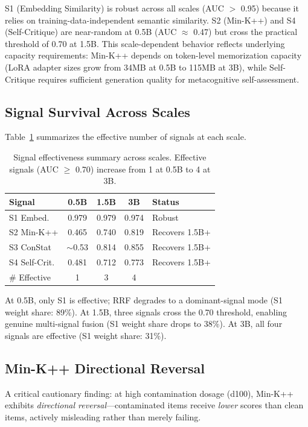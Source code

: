 \documentclass[11pt,a4paper]{article}
\begin{document}
S1 (Embedding Similarity) is robust across all scales (AUC $>$ 0.95) because it relies on training-data-independent semantic similarity.
S2 (Min-K++) and S4 (Self-Critique) are near-random at 0.5B (AUC $\approx$ 0.47) but cross the practical threshold of 0.70 at 1.5B.
This scale-dependent behavior reflects underlying capacity requirements: Min-K++ depends on token-level memorization capacity (LoRA adapter sizes grow from 34MB at 0.5B to 115MB at 3B), while Self-Critique requires sufficient generation quality for metacognitive self-assessment.

\subsection{Signal Survival Across Scales}

Table~\ref{tab:signal_survival} summarizes the effective number of signals at each scale.

\begin{table}[t]
\centering
\small
\caption{Signal effectiveness summary across scales. Effective signals (AUC $\geq$ 0.70) increase from 1 at 0.5B to 4 at 3B.}
\label{tab:signal_survival}
\begin{tabular}{lcccl}
\toprule
\textbf{Signal} & \textbf{0.5B} & \textbf{1.5B} & \textbf{3B} & \textbf{Status} \\
\midrule
S1 Embed. & 0.979 & 0.979 & 0.974 & Robust \\
S2 Min-K++ & 0.465 & 0.740 & 0.819 & Recovers 1.5B+ \\
S3 ConStat & $\sim$0.53 & 0.814 & 0.855 & Recovers 1.5B+ \\
S4 Self-Crit. & 0.481 & 0.712 & 0.773 & Recovers 1.5B+ \\
\midrule
\# Effective & 1 & 3 & 4 & \\
\bottomrule
\end{tabular}
\end{table}

At 0.5B, only S1 is effective; RRF degrades to a dominant-signal mode (S1 weight share: 89\%).
At 1.5B, three signals cross the 0.70 threshold, enabling genuine multi-signal fusion (S1 weight share drops to 38\%).
At 3B, all four signals are effective (S1 weight share: 31\%).

\subsection{Min-K++ Directional Reversal}
\label{sec:reversal}

A critical cautionary finding: at high contamination dosage (d100), Min-K++ exhibits \emph{directional reversal}---contaminated items receive \emph{lower} scores than clean items, actively misleading rather than merely failing.
\end{document}

